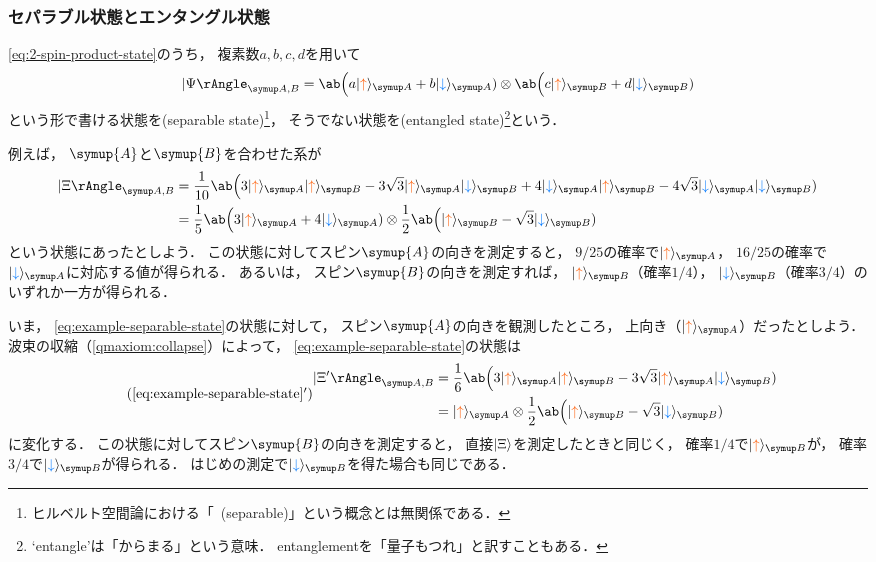 \documentclass[
]{sotsu}
\newcommand{\bitone}{\mathcolor{fire}{\uparrow}}
\newcommand{\bittwo}{\mathcolor{water}{\downarrow}}
\begin{document}
\subsubsection{セパラブル状態とエンタングル状態}

\cref{eq:2-spin-product-state}のうち，
複素数$a, b, c, d$を用いて
\begin{equation}
    \Ket{\Psi}<A,B> = 
        \ab\Big( a \ket{\bitone}<A> + b \ket{\bittwo}<A> )
        \otimes 
        \ab\Big( c \ket{\bitone}<B> + d \ket{\bittwo}<B> )
\end{equation}
という形で書ける状態を(separable state)\footnote{
    ヒルベルト空間論における「~(separable)」という概念とは無関係である．
}，
そうでない状態を(entangled state)\footnote{
    `entangle'は「からまる」という意味．
    entanglementを「量子もつれ」と訳すこともある．
}という．

\quad 
例えば，
$\symup{A}$と$\symup{B}$を合わせた系が
\begin{equation}
    \label{eq:example-separable-state}
    \begin{split}
        \Ket{\Xi}<A,B>
        &= \frac{1}{10} \ab\Big(
              3 \ket{\bitone}<A> \ket{\bitone}<B>
            - 3\sqrt{3} \ket{\bitone}<A> \ket{\bittwo}<B>
            + 4 \ket{\bittwo}<A> \ket{\bitone}<B>
            - 4\sqrt{3} \ket{\bittwo}<A> \ket{\bittwo}<B>
        )
        \\
        &= \frac{1}{5} \ab\Big( 3 \ket{\bitone}<A> + 4 \ket{\bittwo}<A> )
            \otimes 
           \frac{1}{2} \ab\Big( \ket{\bitone}<B> - \sqrt{3} \ket{\bittwo}<B> )
    \end{split}
\end{equation}
という状態にあったとしよう．
この状態に対してスピン$\symup{A}$の向きを測定すると，
$9/25$の確率で$\ket{\bitone}<A>$，
$16/25$の確率で$\ket{\bittwo}<A>$に対応する値が得られる．
あるいは，
スピン$\symup{B}$の向きを測定すれば，
$\ket{\bitone}<B>$（確率$1/4$），
$\ket{\bittwo}<B>$（確率$3/4$）のいずれか一方が得られる．

いま，
\cref{eq:example-separable-state}の状態に対して，
スピン$\symup{A}$の向きを観測したところ，
上向き（$\ket{\bitone}<A>$）だったとしよう．
波束の収縮（\cref{qmaxiom:collapse}）によって，
\cref{eq:example-separable-state}の状態は
\begin{equation*}
    \tag{\ref*{eq:example-separable-state}$'$}
    \begin{split}
        \Ket{\Xi'}<A,B>
        &= \frac{1}{6} \ab\Big(
            3 \ket{\bitone}<A> \ket{\bitone}<B>
            - 3 \sqrt{3} \ket{\bitone}<A> \ket{\bittwo}<B>
        )
        \\
        &= \ket{\bitone}<A>
            \otimes 
           \frac{1}{2} \ab\Big( \ket{\bitone}<B> - \sqrt{3} \ket{\bittwo}<B> )
    \end{split}
\end{equation*}
に変化する．
この状態に対してスピン$\symup{B}$の向きを測定すると，
直接$\ket{\Xi}$を測定したときと同じく，
確率$1/4$で$\ket{\bitone}<B>$が，
確率$3/4$で$\ket{\bittwo}<B>$が得られる．
はじめの測定で$\ket{\bittwo}<B>$を得た場合も同じである．
\end{document}
